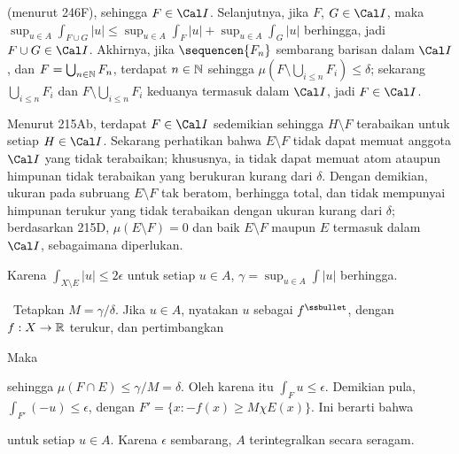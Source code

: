 {

\noindent (menurut 246F), sehingga $F\in\Cal I$. Selanjutnya, jika
$F$, $G\in\Cal I$, maka $\sup_{u\in A}\int_{F\cup G}|u|
\le\sup_{u\in A}\int_F|u|+\sup_{u\in
A}\int_G|u|$ berhingga, jadi $F\cup G\in \Cal I$. Akhirnya, jika
$\sequencen{F_n}$ sembarang barisan dalam $\Cal I$, dan
$F=\bigcup_{n\in\Bbb N}F_n$, terdapat $n\in\Bbb N$ sehingga
$\mu(F\setminus\bigcup_{i\le n}F_i)\le\delta$; sekarang $\bigcup_{i\le n}F_i$
dan $F\setminus\bigcup_{i\le n}F_i$ keduanya termasuk dalam $\Cal I$, jadi
$F\in\Cal I$.

Menurut 215Ab, terdapat $F\in\Cal I$ sedemikian sehingga $H\setminus F$
terabaikan untuk setiap $H\in\Cal I$. Sekarang perhatikan bahwa
$E\setminus F$ tidak dapat memuat anggota $\Cal I$ yang tidak terabaikan;
khususnya, ia tidak dapat memuat atom ataupun himpunan tidak terabaikan yang
berukuran kurang dari $\delta$. Dengan demikian, ukuran pada subruang
$E\setminus F$ tak beratom, berhingga total, dan tidak mempunyai
himpunan terukur yang tidak terabaikan dengan ukuran
kurang dari $\delta$; berdasarkan 215D, $\mu(E\setminus F)=0$ dan baik
$E\setminus F$ maupun $E$ termasuk dalam $\Cal I$, sebagaimana diperlukan.\ \Qed

Karena $\int_{X\setminus E}|u|\le 2\epsilon$ untuk setiap $u\in A$,
$\gamma=\sup_{u\in A}\int|u|$ berhingga.

\medskip

\quad\grheadb\
Tetapkan $M=\gamma/\delta$. Jika $u\in A$, nyatakan $u$ sebagai
$f^{\ssbullet}$, dengan $f:X\to\Bbb R$ terukur, dan pertimbangkan


\noindent Maka


\noindent sehingga $\mu(F\cap E)\le\gamma/M=\delta$. Oleh karena itu
$\int_Fu\le\epsilon$. Demikian pula, $\int_{F'}(-u)\le\epsilon$, dengan
$F'=\{x:-f(x)\ge M\chi E(x)\}$. Ini berarti bahwa


\noindent untuk setiap $u\in A$. Karena $\epsilon$ sembarang, $A$
terintegralkan secara seragam.
}%

